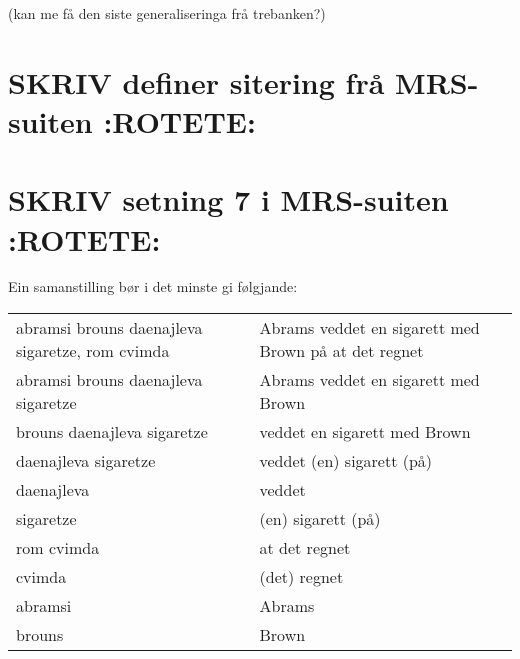 \documentclass[11pt,a4paper,oneside,draft]{book}
\begin{document}
(kan me få den siste generaliseringa frå trebanken?)


\section{\textbf{SKRIV} definer sitering frå MRS-suiten \textbf{:ROTETE:}}
\label{sec-3.17}

\section{\textbf{SKRIV} setning 7 i MRS-suiten \textbf{:ROTETE:}}
\label{sec-3.18}



  

Ein samanstilling bør i det minste gi følgjande:


\begin{center}
\begin{tabular}{ll}
 abramsi brouns daenajleva sigaretze, rom cvimda  &  Abrams veddet en sigarett med Brown på at det regnet  \\
 abramsi brouns daenajleva sigaretze              &  Abrams veddet en sigarett med Brown                   \\
 brouns daenajleva sigaretze                      &  veddet en sigarett med Brown                          \\
 daenajleva sigaretze                             &  veddet (en) sigarett (på)                             \\
 daenajleva                                       &  veddet                                                \\
 sigaretze                                        &  (en) sigarett (på)                                    \\
 rom cvimda                                       &  at det regnet                                         \\
 cvimda                                           &  (det) regnet                                          \\
 abramsi                                          &  Abrams                                                \\
 brouns                                           &  Brown                                                 \\
\end{tabular}
\end{center}
\end{document}

